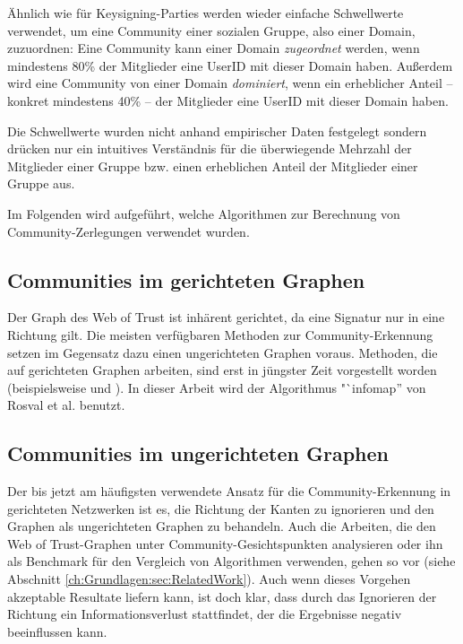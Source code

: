 Ähnlich wie für Keysigning-Parties werden wieder einfache
Schwellwerte verwendet, um eine Community einer sozialen Gruppe, also
einer Domain, zuzuordnen: Eine Community kann einer Domain
\emph{zugeordnet} werden, wenn mindestens 80\% der Mitglieder
eine UserID mit dieser Domain haben. Außerdem wird eine Community von
einer Domain \emph{dominiert}, wenn ein erheblicher Anteil -- konkret
mindestens 40\% -- der Mitglieder eine UserID mit dieser Domain haben.

Die Schwellwerte wurden nicht anhand empirischer Daten festgelegt
sondern drücken nur ein intuitives Verständnis für die
überwiegende Mehrzahl der Mitglieder einer Gruppe bzw. einen
erheblichen Anteil der Mitglieder einer Gruppe aus.

Im Folgenden wird aufgef\"uhrt, welche Algorithmen zur Berechnung von
Community-Zerlegungen verwendet wurden.

\subsection{Communities im gerichteten Graphen}
\label{sec:comm-gericht-graph}
Der Graph des Web of Trust ist inhärent gerichtet, da eine Signatur
nur in eine Richtung gilt. Die meisten verfügbaren Methoden zur
Community-Erkennung setzen im Gegensatz dazu einen ungerichteten
Graphen voraus. Methoden, die auf gerichteten Graphen arbeiten, sind
erst in jüngster Zeit vorgestellt worden (beispielsweise
\cite{Leicht2008} und \cite{Rosvall2008}). In dieser Arbeit wird der Algorithmus
"`infomap'' von Rosval et al. \cite{Rosvall2008} benutzt. 

\subsection{Communities im ungerichteten Graphen}
\label{sec:comm-unger-graph}

Der bis jetzt am häufigsten verwendete Ansatz für die
Community-Erkennung in gerichteten Netzwerken ist es, die Richtung der
Kanten zu ignorieren und den Graphen als ungerichteten Graphen zu
behandeln. Auch die Arbeiten, die den Web of Trust-Graphen unter
Community-Gesichtspunkten analysieren oder ihn als Benchmark für den
Vergleich von Algorithmen verwenden, gehen so vor (siehe Abschnitt
\ref{ch:Grundlagen:sec:RelatedWork}). Auch wenn dieses Vorgehen akzeptable Resultate
liefern kann, ist doch klar, dass durch das Ignorieren der Richtung
ein Informationsverlust stattfindet, der die Ergebnisse negativ
beeinflussen kann.

